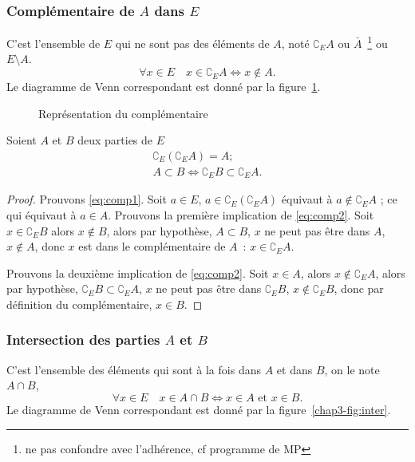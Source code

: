 \subsubsection{Complémentaire de \(A\) dans \(E\)} 
\label{chap3-subsubsec:complementaire}
C'est l'ensemble de \(E\) qui ne sont pas des éléments de \(A\), noté \(\complement_E A\) ou \(\bar{A}\)~\footnote{ne pas confondre avec l'adhérence, cf programme de MP} ou \(E \setminus A\).
\begin{equation} 
  \forall x \in E \quad x \in \complement_E A \iff x \not\in A.
\end{equation}
Le diagramme de Venn correspondant est donné par la figure~\ref{chap3-fig:comp}.
%
\begin{figure}
\centering
{}
\caption{Représentation du complémentaire}
\label{chap3-fig:comp}
\end{figure}
%
\begin{prop}
  Soient \(A\) et \(B\) deux parties de \(E\)
  \begin{gather}
  \complement_E (\complement_E A)=A; \label{eq:comp1}\\
  A \subset B \iff \complement_E B \subset \complement_E A. \label{eq:comp2}
  \end{gather}
\end{prop}
\begin{proof}
    Prouvons \eqref{eq:comp1}. Soit \(a \in E\), \(a \in \complement_E (\complement_E A)\) équivaut à \(a \not\in \complement_E A\) ; ce qui équivaut à \(a \in A\). Prouvons la première implication de \eqref{eq:comp2}. Soit \(x \in \complement_E B\) alors \(x \not\in B\), alors par hypothèse, \(A \subset B\), \(x\) ne peut pas être dans \(A\), \(x \not\in A\), donc \(x\) est dans le complémentaire de \(A\)~: \(x \in \complement_E A\).

    Prouvons la deuxième implication de \eqref{eq:comp2}. Soit \(x \in A\), alors \(x \not\in \complement_E A\), alors par hypothèse, \(\complement_E B \subset \complement_E A\), \(x\) ne peut pas être dans \(\complement_E B\), \(x \not\in \complement_E B\), donc par définition du complémentaire, \(x \in B\).
\end{proof}
%
\subsubsection{Intersection des parties \(A\) et \(B\)}
\label{chap3-subsubsec:intersection}
C'est l'ensemble des éléments qui sont à la fois dans \(A\) et dans \(B\), on le note \(A \cap B\),
\begin{equation}
  \forall x \in E \quad x \in A \cap B \iff x \in A \text{~et~} x \in B.
\end{equation}
Le diagramme de Venn correspondant est donné par la figure~\ref{chap3-fig:inter}.

